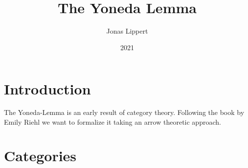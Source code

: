 \documentclass{article}
\title{The Yoneda Lemma}
\author{Jonas Lippert}
\date{2021}
\begin{document}
	
	\maketitle
	
	
	
	\section{Introduction}
	
	The Yoneda-Lemma is an early result of category theory. Following the book by Emily Riehl we want to formalize it taking an arrow theoretic approach.
	\newpage
	
	\section{Categories}
	\begin{comment}
	\begin{forthel}
	[synonym arrow/-s][synonym category/categories][synonym functor/-s]
	
	[checktime 10]
	[timelimit 10]
	[depthlimit 10]
	[checkdepth 10]
	\end{forthel}
	\end{comment}
	
\end{document}
